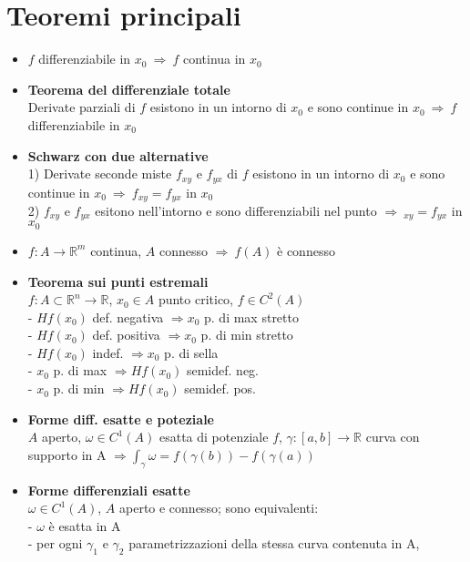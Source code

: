\documentclass[a4paper,portrait,columns=3,5pt]{cheatsheet}
\begin{document}
\section{Teoremi principali}
\begin{itemize}
	\item $f$ differenziabile in $x_0~ \Rightarrow~f$ continua in $x_0 $
	\item \textbf{Teorema del differenziale totale} \\ Derivate parziali di $f$ esistono in un intorno di $x_0$ e sono continue in $x_0~\Rightarrow ~ f$ differenziabile in $x_0$ 
	\item \textbf{Schwarz con due alternative} \\ 1) Derivate seconde miste $f_{xy}$ e $f_{yx}$ di $f$ esistono in un intorno di $x_0$ e sono continue in $x_0~\Rightarrow~f_{xy} = f_{yx}$ in $x_0$
			\\ 2) $f_{xy}$ e $f_{yx}$ esitono nell'intorno e sono differenziabili nel punto $\Rightarrow~_{xy} = f_{yx}$ in $x_0$
	\item $f : A \rightarrow \mathbb{R}^m$ continua, $A$ connesso $\Rightarrow~f(A)$ è connesso
	\item \textbf{Teorema sui punti estremali}\\
			$f:A\subset \mathbb{R}^n \rightarrow \mathbb{R}$, $x_0 \in A$ punto critico, $f\in C^2(A)$\\
			- $Hf(x_0)$ def. negativa $\Rightarrow x_0$ p. di max stretto \\
			- $Hf(x_0)$ def. positiva $\Rightarrow x_0$ p. di min stretto \\
			- $Hf(x_0)$ indef. $\Rightarrow x_0$ p. di sella\\
			- $x_0$ p. di max $\Rightarrow Hf(x_0)$ semidef. neg.\\
			- $x_0$ p. di min $\Rightarrow Hf(x_0)$ semidef. pos.
	\item \textbf{Forme diff. esatte e poteziale}\\
			$A$ aperto, $\omega\in C^1(A)$ esatta di potenziale $f$, $\gamma :[a,b]\rightarrow \mathbb{R}$ curva con supporto in A 
			$\Rightarrow \int_\gamma \omega = f(\gamma(b)) - f(\gamma(a))$
	\item \textbf{Forme differenziali esatte} \\
			$\omega \in C^1(A)$, $A$ aperto e connesso; sono equivalenti:\\
				- $\omega$ è esatta in A\\
				- per ogni $\gamma_1$ e $\gamma_2$ parametrizzazioni della stessa curva contenuta in A, 

\end{itemize}
\end{document}
